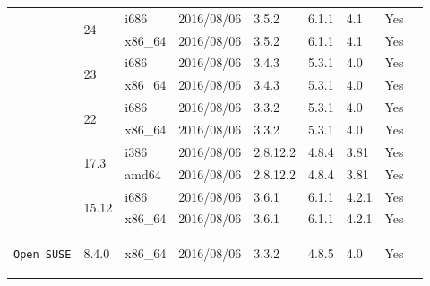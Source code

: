 \documentclass[11pt,twoside,openany,x11names,svgnames]{memoir}
\begin{document}
{\begin{longtable}{| >{\bfseries}p{3cm} | p{2.6cm} | p{1cm} | p{1.5cm} | p{1cm} | p{0.7cm} | p{0.7cm} | p{0.8cm} | p{1.5cm} |}
	\multirow{4}{*}{\texttt{Fedora Workstation}}  & \multirow{2}{*}{24}            & i686   & 2016/08/06  & 3.5.2    & 6.1.1 & 4.1   & Yes   &  \\
												    						       \cline{3-8}
	                                              &                                & x86\_64& 2016/08/06  & 3.5.2    & 6.1.1 & 4.1   & Yes   &  \\
	                                              \cline{2-8}
	                                              & \multirow{2}{*}{23}            & i686   & 2016/08/06  & 3.4.3    & 5.3.1 & 4.0   & Yes   &  \\
	                                              							       \cline{3-8}
	                                              &                                & x86\_64& 2016/08/06  & 3.4.3    & 5.3.1 & 4.0   & Yes   &  \\
	                                              \cline{2-8}
	                                              & \multirow{2}{*}{22}            & i686   & 2016/08/06  & 3.3.2    & 5.3.1 & 4.0   & Yes   &  \\
	                                              							       \cline{3-8}
	                                              &                                & x86\_64& 2016/08/06  & 3.3.2    & 5.3.1 & 4.0   & Yes   &  \\

	\hline	
	\hline
	
	\multirow{2}{*}{\texttt{Linux Mint}}          & \multirow{2}{*}{17.3}          & i386   & 2016/08/06  & 2.8.12.2 & 4.8.4 & 3.81  & Yes   &  \\
												     						       \cline{3-8}
	                                              &                                & amd64  & 2016/08/06  & 2.8.12.2 & 4.8.4 & 3.81  & Yes   &  \\

	\hline
	\hline
	
	\multirow{2}{*}{\texttt{Manjaro}}             & \multirow{2}{*}{15.12}         & i686   & 2016/08/06  & 3.6.1    & 6.1.1 & 4.2.1 & Yes   &  \\
											    							       \cline{3-8}
	                                              &                                & x86\_64& 2016/08/06  & 3.6.1    & 6.1.1 & 4.2.1 & Yes   &  \\

	\hline
	\hline
	                                         
	\texttt{Open SUSE}                            & 8.4.0                          & x86\_64& 2016/08/06  & 3.3.2    & 4.8.5 & 4.0   & Yes   &  \\
	  

\end{longtable}}
\end{document}
